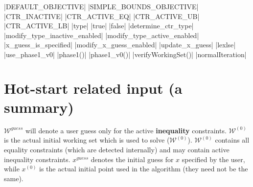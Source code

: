 \documentclass[12pt,a4paper]{article}
\begin{document}
|DEFAULT_OBJECTIVE|
|SIMPLE_BOUNDS_OBJECTIVE|
|CTR_INACTIVE|
|CTR_ACTIVE_EQ|
|CTR_ACTIVE_UB|
|CTR_ACTIVE_LB|
|type|
|true|
|false|
|determine_ctr_type|
|modify_type_inactive_enabled|
|modify_type_active_enabled|
|x_guess_is_specified|
|modify_x_guess_enabled|
|update_x_guess|
|lexlse|
|use_phase1_v0|
|phase1()|
|phase1_v0()|
|verifyWorkingSet()|
|normalIteration|

\section{Hot-start related input (a summary)}

$\mathcal{W}^{\mathit{guess}}$ will denote a user guess only for the active {\bf inequality}
constraints. $\mathcal{W}^{(0)}$ is the actual initial working set which is used to solve
($\mathcal{W}^{(0)}$). $\mathcal{W}^{(0)}$ contains all equality constraints (which are
detected internally) and may contain active inequality constraints. $x^{\mathit{guess}}$ denotes the
initial guess for $x$ specified by the user, while $x^{(0)}$ is the actual initial point used in the
algorithm (they need not be the same).
\end{document}
